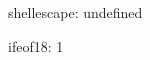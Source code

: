 shellescape: \ifx\shellescape\undefined
  undefined
\else
  \ifcase{}   \fi
\fi

ifeof18:  1  \fi

\bye
